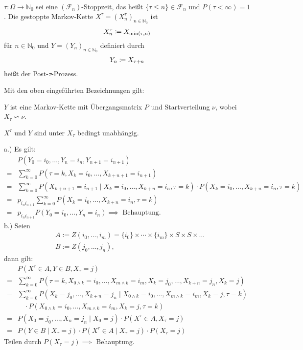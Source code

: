 \documentclass[a4paper,twoside,DIV15,BCOR12mm]{scrbook}
\newcommand{\cF}{\mathcal F}
\begin{document}
$\tau:\Omega \to \mathbb N_0$ sei eine $(\cF_n)$-Stoppzeit, das heißt $\{\tau \le n\} \in \cF_n$ und $P(\tau <\infty) = 1$. Die gestoppte Markov-Kette $X^\tau=(X_n^\tau)_{n\in\mathbb N_0}$ ist
\begin{align*}
X_n^\tau \da X_{\min(\tau,n)}
\end{align*}
für $n\in \mathbb N_0$ und $Y=(Y_n)_{n\in\mathbb N_0}$ definiert durch
\begin{align*}
Y_n \da X_{\tau + n}
\end{align*}
heißt der Post-$\tau$-Prozess.

\begin{satz}
  \label{Satz6.1}
  Mit den oben eingeführten Bezeichnungen gilt:
  \begin{enuma}
  \item $Y$ ist eine Markov-Kette mit Übergangsmatrix $P$ 
    und Startverteilung $\nu$, wobei $X_\tau\backsim\nu$.
  \item $X^\tau$ und $Y$ sind unter $X_\tau$ bedingt unabhängig.
  \end{enuma}
\end{satz}

\begin{beweis}
  a.) Es gilt:
  \begin{align*}
    & P(Y_0=i_0,\dots,Y_n=i_n,Y_{n+1}=i_{n+1}) \\
    = & \sum_{k=0}^\infty P(\tau=k,X_k=i_0,\dots,X_{k+n+1}=i_{n+1}) \\
    = & \sum_{k=0}^\infty P(X_{k+n+1} = i_{n+1} \mid X_k=i_0,\dots,X_{k+n}=i_n,\tau=k) 
    \cdot P(X_k=i_0,\dots,X_{k+n}=i_n,\tau=k) \\
    = & p_{i_n i_{n+1}} \sum_{k=0}^\infty P(X_k=i_0,\dots,X_{k+n}=i_n,\tau=k) \\
    = & p_{i_n i_{n+1}} P(Y_0=i_0,\dots,Y_n=i_n) \implies \text{ Behauptung}.
  \end{align*}
  b.) Seien
  \begin{align*}
    & A:=Z(i_0,\dots,i_m)=\{i_0\} \times \cdots \times \{i_m\}\times S\times S \times\dots \\
    & B:=Z(j_0,\dots,j_n),
  \end{align*}
  dann gilt:
  \begin{align*}
    & P(X^\tau\in A,Y\in B,X_\tau =j) \\
    =& \sum_{k=0}^\infty P(\tau=k,X_{0\wedge k}=i_0,\dots,X_{m\wedge k}=i_m,
    X_k=j_0,\dots,X_{k+n}=j_n,X_k=j) \\
    =& \sum_{k=0}^\infty P(X_k=j_0,\dots,X_{k+n}=j_n\mid 
    X_{0\wedge k}=i_0,\dots,X_{m\wedge k}=i_m,X_k=j,\tau=k) \\
    & \quad \cdot P(X_{0\wedge k}=i_0,\dots,X_{m\wedge k}=i_m,X_k=j,\tau=k) \\
    =& P(X_0=j_0,\dots,X_n=j_n\mid X_0=j) \cdot P(X^\tau \in A, X_\tau=j) \\
    =& P(Y\in B\mid X_\tau=j) \cdot P(X^\tau\in A\mid X_\tau=j) \cdot P(X_\tau=j) 
  \end{align*}
  Teilen durch $P(X_\tau=j) \implies$ Behauptung.
\end{beweis}
\end{document}
